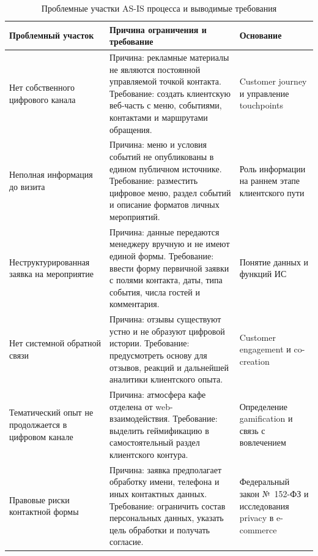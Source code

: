 \begin{table}[H]
\centering
\small
\caption{Проблемные участки AS-IS процесса и выводимые требования}
\label{tab:v2_problems_requirements}
\begin{tabularx}{\textwidth}{|>{\raggedright\arraybackslash}p{}|>{\raggedright\arraybackslash}p{}|>{\raggedright\arraybackslash}X|}
\hline
\textbf{Проблемный участок} & \textbf{Причина ограничения и требование} & \textbf{Основание} \\ \hline
Нет собственного цифрового канала & Причина: рекламные материалы не являются постоянной управляемой точкой контакта. Требование: создать клиентскую веб-часть с меню, событиями, контактами и маршрутами обращения. & Customer journey и управление touchpoints~\cite{stickdorn2018,pantouvakis2022} \\ \hline
Неполная информация до визита & Причина: меню и условия событий не опубликованы в едином публичном источнике. Требование: разместить цифровое меню, раздел событий и описание форматов личных мероприятий. & Роль информации на раннем этапе клиентского пути~\cite{rita2022} \\ \hline
Неструктурированная заявка на мероприятие & Причина: данные передаются менеджеру вручную и не имеют единой формы. Требование: ввести форму первичной заявки с полями контакта, даты, типа события, числа гостей и комментария. & Понятие данных и функций ИС~\cite{gost34003,utkin_baldin_2003} \\ \hline
Нет системной обратной связи & Причина: отзывы существуют устно и не образуют цифровой истории. Требование: предусмотреть основу для отзывов, реакций и дальнейшей аналитики клиентского опыта. & Customer engagement и co-creation~\cite{pansari2017,chathoth2016} \\ \hline
Тематический опыт не продолжается в цифровом канале & Причина: атмосфера кафе отделена от web-взаимодействия. Требование: выделить геймификацию в самостоятельный раздел клиентского контура. & Определение gamification и связь с вовлечением~\cite{deterding2011,behnam2021} \\ \hline
Правовые риски контактной формы & Причина: заявка предполагает обработку имени, телефона и иных контактных данных. Требование: ограничить состав персональных данных, указать цель обработки и получать согласие. & Федеральный закон №~152-ФЗ и исследования privacy в e-commerce~\cite{fz152,moric2024} \\ \hline
\end{tabularx}
\normalsize
\end{table}

